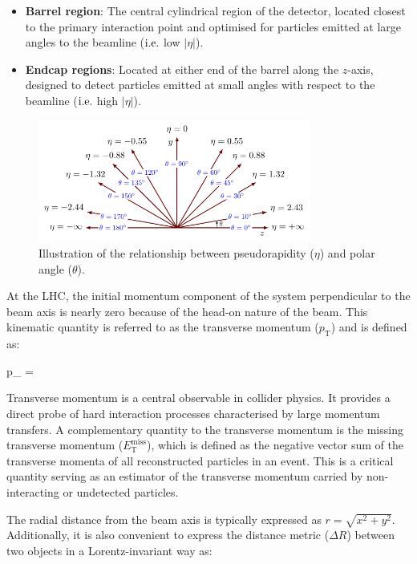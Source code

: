 \begin{itemize} 
\item \textbf{Barrel region}: The central cylindrical region of the detector, located closest to the primary interaction point and optimised for particles emitted at large angles to the beamline ($\mbox{i.e.}$ low $|\eta|$). 
\item \textbf{Endcap regions}: Located at either end of the barrel along the $z$-axis, designed to detect particles emitted at small angles with respect to the beamline ($\mbox{i.e.}$ high $|\eta|$). 
\end{itemize}

\begin{figure}[h]
\centering
\includegraphics[width= 0.8\textwidth]{Figures/Chapter3/Pseudorapidity.pdf}
\caption{Illustration of the relationship between pseudorapidity ($\eta$) and polar angle ($\theta$).}
\label{Figure:Chapter3_Pseudorapidity}
\end{figure}

At the LHC, the initial momentum component of the system perpendicular to the beam axis is nearly zero because of the head-on nature of the beam. This kinematic quantity is referred to as the transverse momentum ($p_\mathrm{T}$) and is defined as:

\begin{equation_pad}
    p_ = 
\end{equation_pad}

Transverse momentum is a central observable in collider physics. It provides a direct probe of hard interaction processes characterised by large momentum transfers. A complementary quantity to the transverse momentum is the missing transverse momentum ($E_\mathrm{T}^{\text{miss}}$), which is defined as the negative vector sum of the transverse momenta of all reconstructed particles in an event. This is a critical quantity serving as an estimator of the transverse momentum carried by non-interacting or undetected particles.

The radial distance from the beam axis is typically expressed as $r = \sqrt{x^2+y^2}$. Additionally, it is also convenient to express the distance metric ($\Delta R$) between two objects in a Lorentz-invariant way as:

